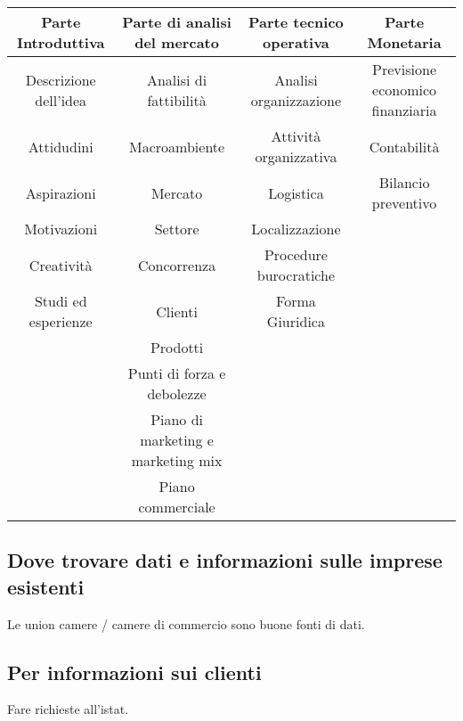\begin{tabular}{|c|c|c|c|}
  \hline
  \textbf{Parte Introduttiva} & \textbf{Parte di analisi del mercato} & \textbf{Parte tecnico operativa} & \textbf{Parte Monetaria}         \\
  \hline
  Descrizione dell'idea       & Analisi di fattibilità                & Analisi organizzazione           & Previsione economico finanziaria \\
  \hline
  Attidudini                  & Macroambiente                         & Attività organizzativa           & Contabilità                      \\
  Aspirazioni                 & Mercato                               & Logistica                        & Bilancio preventivo              \\
  Motivazioni                 & Settore                               & Localizzazione                   &                                  \\
  Creatività                  & Concorrenza                           & Procedure burocratiche           &                                  \\
  Studi ed esperienze         & Clienti                               & Forma Giuridica                  &                                  \\
                              & Prodotti                              &                                  &                                  \\
                              & Punti di forza e debolezze            &                                  &                                  \\
                              & Piano di marketing e marketing mix    &                                  &                                  \\
                              & Piano commerciale                     &                                  &                                  \\
  \hline
\end{tabular}

\subsection{Dove trovare dati e informazioni sulle imprese esistenti}
Le union camere / camere di commercio sono buone fonti di dati.

\subsection{Per informazioni sui clienti}
Fare richieste all'istat.

